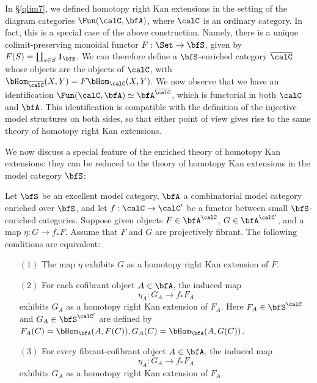 \begin{remark}
In \S \ref{qlim7}, we defined homotopy right Kan extensions in the setting of
the diagram categories $\Fun( \calC, \bfA)$, where $\calC$ is an ordinary category.
In fact, this is a special case of the above construction. Namely, there is a unique colimit-preserving monoidal functor $F: \Set \rightarrow \bfS$, given by $F(S) = \coprod_{s \in S} {\bf 1}_{\bfS}$. We can therefore define a $\bfS$-enriched category $\overline{\calC}$ whose objects are the objects of $\calC$, with $\bHom_{ \overline{\calC} }(X,Y) = F \bHom_{\calC}(X,Y)$. We
now observe that we have an identification $\Fun( \calC, \bfA) \simeq \bfA^{\overline{\calC}}$, which is functorial in both $\calC$ and $\bfA$. This identification is compatible with the definition
of the injective model structures on both sides, so that either point of view gives rise to the same theory of homotopy right Kan extensions.
\end{remark}

We now discuss a special feature of the enriched theory of homotopy Kan extensions:
they can be reduced to the theory of homotopy Kan extensions in the model category $\bfS$:

\begin{proposition}\label{usecoinc}
Let $\bfS$ be an excellent model category, $\bfA$ a combinatorial model category
enriched over $\bfS$, and let $f: \calC \rightarrow \calC'$ be a functor between
small $\bfS$-enriched categories. Suppose
given objects $F \in \bfA^{\calC}$, $G \in \bfA^{\calC'}$, and a map $\eta: G \rightarrow f_{\ast} F$. 
Assume that $F$ and $G$ are projectively fibrant.
The following conditions are equivalent:

\begin{itemize}
\item[$(1)$]  The map $\eta$ exhibits $G$ as a homotopy right Kan extension of $F$.

\item[$(2)$] For each cofibrant object $A \in \bfA$, the induced map
$$ \eta_A: G_A \rightarrow f_{\ast} F_A$$
exhibits $G_A$ as a homotopy right Kan extension of $F_A$. Here $F_A \in \bfS^{\calC}$
and $G_A \in \bfS^{\calC'}$ are defined by $F_A(C) = \bHom_{\bfA}(A,F(C)), G_A(C) = \bHom_{\bfA}(A,G(C))$. 

\item[$(3)$] For every fibrant-cofibrant object $A \in \bfA$, the induced map
$$ \eta_A: G_A \rightarrow f_{\ast} F_A$$
exhibits $G_A$ as a homotopy right Kan extension of $F_A$.
\end{itemize}
\end{proposition}

